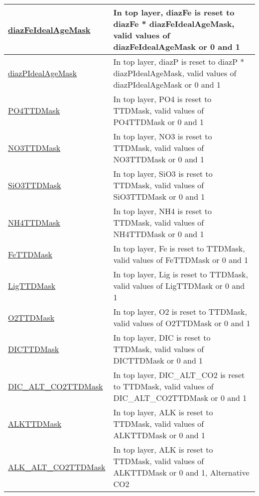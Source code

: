 {\begin{center}
\begin{longtable}{| p{2.0in} | p{4.0in} |}
    \hline
    \hyperref[subsec:var_sec_forcing_diazFeIdealAgeMask]{diazFeIdealAgeMask} & In top layer, diazFe is reset to diazFe * diazFeIdealAgeMask, valid values of diazFeIdealAgeMask or 0 and 1 \\
    \hline
    \hyperref[subsec:var_sec_forcing_diazPIdealAgeMask]{diazPIdealAgeMask} & In top layer, diazP is reset to diazP * diazPIdealAgeMask, valid values of diazPIdealAgeMask or 0 and 1 \\
    \hline
    \hyperref[subsec:var_sec_forcing_PO4TTDMask]{PO4TTDMask} & In top layer, PO4 is reset to TTDMask, valid values of PO4TTDMask or 0 and 1 \\
    \hline
    \hyperref[subsec:var_sec_forcing_NO3TTDMask]{NO3TTDMask} & In top layer, NO3 is reset to TTDMask, valid values of NO3TTDMask or 0 and 1 \\
    \hline
    \hyperref[subsec:var_sec_forcing_SiO3TTDMask]{SiO3TTDMask} & In top layer, SiO3 is reset to TTDMask, valid values of SiO3TTDMask or 0 and 1 \\
    \hline
    \hyperref[subsec:var_sec_forcing_NH4TTDMask]{NH4TTDMask} & In top layer, NH4 is reset to TTDMask, valid values of NH4TTDMask or 0 and 1 \\
    \hline
    \hyperref[subsec:var_sec_forcing_FeTTDMask]{FeTTDMask} & In top layer, Fe is reset to TTDMask, valid values of FeTTDMask or 0 and 1 \\
    \hline
    \hyperref[subsec:var_sec_forcing_LigTTDMask]{LigTTDMask} & In top layer, Lig is reset to TTDMask, valid values of LigTTDMask or 0 and 1 \\
    \hline
    \hyperref[subsec:var_sec_forcing_O2TTDMask]{O2TTDMask} & In top layer, O2 is reset to TTDMask, valid values of O2TTDMask or 0 and 1 \\
    \hline
    \hyperref[subsec:var_sec_forcing_DICTTDMask]{DICTTDMask} & In top layer, DIC is reset to TTDMask, valid values of DICTTDMask or 0 and 1 \\
    \hline
    \hyperref[subsec:var_sec_forcing_DIC_ALT_CO2TTDMask]{DIC\_ALT\_CO2TTDMask} & In top layer, DIC\_ALT\_CO2 is reset to TTDMask, valid values of DIC\_ALT\_CO2TTDMask or 0 and 1 \\
    \hline
    \hyperref[subsec:var_sec_forcing_ALKTTDMask]{ALKTTDMask} & In top layer, ALK is reset to TTDMask, valid values of ALKTTDMask or 0 and 1 \\
    \hline
    \hyperref[subsec:var_sec_forcing_ALK_ALT_CO2TTDMask]{ALK\_ALT\_CO2TTDMask} & In top layer, ALK is reset to TTDMask, valid values of ALKTTDMask or 0 and 1, Alternative CO2 \\

\end{longtable}
\end{center}}
